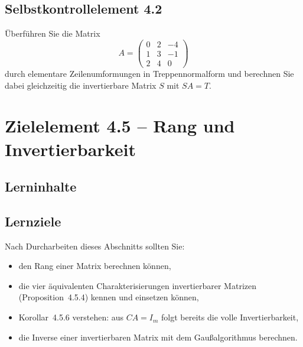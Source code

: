 \documentclass[a4paper,12pt]{article}
\begin{document}
\subsection*{Selbstkontrollelement 4.2}

Überführen Sie die Matrix
\[
  A = \begin{pmatrix} 0 & 2 & -4 \\ 1 & 3 & -1 \\ 2 & 4 & 0 \end{pmatrix}
\]
durch elementare Zeilenumformungen in Treppennormalform und berechnen Sie dabei
gleichzeitig die invertierbare Matrix $S$ mit $SA = T$.

\newpage

\section*{Zielelement 4.5 -- Rang und Invertierbarkeit}

\subsection*{Lerninhalte}

\begin{center}
\end{center}

\subsection*{Lernziele}

Nach Durcharbeiten dieses Abschnitts sollten Sie:
\begin{itemize}
  \item den Rang einer Matrix berechnen können,
  \item die vier äquivalenten Charakterisierungen invertierbarer Matrizen
        (Proposition~4.5.4) kennen und einsetzen können,
  \item Korollar~4.5.6 verstehen: aus $CA = I_m$ folgt bereits die volle Invertierbarkeit,
  \item die Inverse einer invertierbaren Matrix mit dem Gaußalgorithmus berechnen.
\end{itemize}
\end{document}
